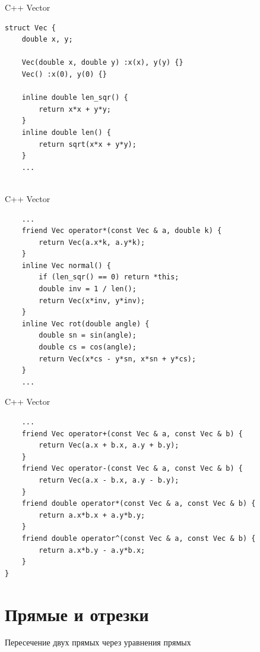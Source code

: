 \documentclass{beamer}
\begin{document}
\begin{frame}[fragile]{C++ Vector}
    \begin{verbatim}
struct Vec {
	double x, y;

	Vec(double x, double y) :x(x), y(y) {}
	Vec() :x(0), y(0) {}

	inline double len_sqr() {
		return x*x + y*y;
	}
	inline double len() {
		return sqrt(x*x + y*y);
	}
	...
    	
    \end{verbatim}
\end{frame}

\begin{frame}[fragile]{C++ Vector}
    \begin{verbatim}
    ...
    friend Vec operator*(const Vec & a, double k) {
        return Vec(a.x*k, a.y*k);
    }
    inline Vec normal() {
        if (len_sqr() == 0) return *this;
        double inv = 1 / len();
        return Vec(x*inv, y*inv);
    }
    inline Vec rot(double angle) {
        double sn = sin(angle);
        double cs = cos(angle);
        return Vec(x*cs - y*sn, x*sn + y*cs);
    }
    ...
    \end{verbatim}
\end{frame}

\begin{frame}[fragile]{C++ Vector}
    \begin{verbatim}
    ...
    friend Vec operator+(const Vec & a, const Vec & b) {
        return Vec(a.x + b.x, a.y + b.y);
    }
    friend Vec operator-(const Vec & a, const Vec & b) {
        return Vec(a.x - b.x, a.y - b.y);
    }
    friend double operator*(const Vec & a, const Vec & b) {
        return a.x*b.x + a.y*b.y;
    }
    friend double operator^(const Vec & a, const Vec & b) {
        return a.x*b.y - a.y*b.x;
    }
}
    \end{verbatim}
\end{frame}
\section{Прямые и отрезки}
\begin{frame}{Пересечение двух прямых через уравнения прямых}
\begin{figure}
\end{figure}
\end{frame}
\end{document}
